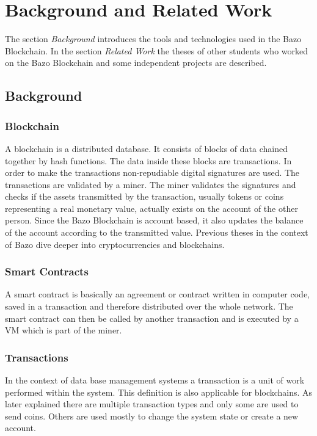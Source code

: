 \chapter{Background and Related Work}
\thispagestyle{main} %

The section \textit{Background} introduces the tools and technologies used in the Bazo Blockchain. In the section \textit{Related Work} the theses of other students who worked on the Bazo Blockchain and some independent projects are described.

\section{Background}
\subsection{Blockchain}
A blockchain is a distributed database. It consists of blocks of data chained together by hash functions. The data inside these blocks are transactions. In order to make the transactions non-repudiable digital signatures are used. The transactions are validated by a miner. The miner validates the signatures and checks if the assets transmitted by the transaction, usually tokens or coins representing a real monetary value, actually exists on the account of the other person. Since the Bazo Blockchain is account based, it also updates the balance of the account according to the transmitted value. Previous theses in the context of Bazo dive deeper into cryptocurrencies and blockchains. \cite{ba_miner} \cite{ba_client} 

\subsection{Smart Contracts}
A smart contract is basically an agreement or contract written in computer code, saved in a transaction and therefore distributed over the whole network. The smart contract can then be called by another transaction and is executed by a VM which is part of the miner.

\subsection{Transactions}
In the context of data base management systems a transaction is a unit of work performed within the system. \cite{dbtransaction} This definition is also applicable for blockchains. As later explained there are multiple transaction types and only some are used to send coins. Others are used mostly to change the system state or create a new account.

